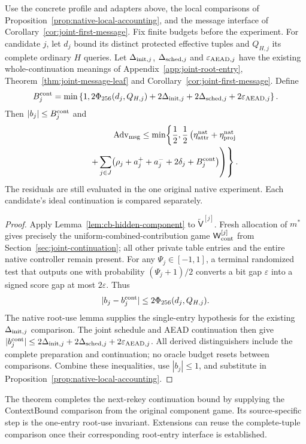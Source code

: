 \begin{theorem}
\label{thm:cb-next-rekey}
Use the concrete profile and adapters above, the local comparisons of
Proposition~\ref{prop:native-local-accounting}, and the message interface
of Corollary~\ref{cor:joint-first-message}. Fix finite budgets before the
experiment. For candidate $j$, let $d_j$ bound its distinct protected
effective tuples and $Q_{H,j}$ its complete ordinary $H$ queries. Let
$\Delta_{{\rm init},j}$, $\Delta_{{\rm sched},j}$ and
$\varepsilon_{{\rm AEAD},j}$ have the existing whole-continuation meanings
of Appendix~\ref{app:joint-root-entry},
Theorem~\ref{thm:joint-message-leaf} and
Corollary~\ref{cor:joint-first-message}. Define
\begin{equation}
 B_j^{\rm cont}=\min\left\{1,
 2\Phi_{256}(d_j,Q_{H,j})+2\Delta_{{\rm init},j}
 +2\Delta_{{\rm sched},j}+2\varepsilon_{{\rm AEAD},j}\right\}.
 \label{eq:cb-continuation-bound}
\end{equation}
Then $|b_j|\le B_j^{\rm cont}$ and
\begin{equation}
\begin{split}
 \operatorname{Adv}_{\rm msg}\le
 \min\!\left\{\frac12,\frac12\left(
 \eta_{\rm attr}^{\rm nat}+\eta_{\rm proj}^{\rm nat}\right.\right.\\[-2pt]
 \left.\left.\qquad+
 \sum_{j\in J}\bigl(\rho_j+a_j^++a_j^-+2\delta_j+B_j^{\rm cont}\bigr)
 \right)\right\}.
\end{split}
 \label{eq:cb-native-bound}
\end{equation}
The residuals are still evaluated in the one original native experiment.
Each candidate's ideal continuation is compared separately.
\end{theorem}
\begin{proof}
Apply Lemma~\ref{lem:cb-hidden-component} to
$\widetilde{\mathsf V}^{[j]}$. Fresh allocation of $m^*$ gives precisely
the uniform-combined-contribution game
$\mathsf W_{\rm cont}^{[j]}$ from
Section~\ref{sec:joint-continuation}; all other private table entries and
the entire native controller remain present. For any
$\Psi_j\in[-1,1]$, a terminal randomized test that outputs one with
probability $(\Psi_j+1)/2$ converts a bit gap $\varepsilon$ into a signed
score gap at most $2\varepsilon$. Thus
\[
 |b_j-b_j^{\rm cont}|\le2\Phi_{256}(d_j,Q_{H,j}).
\]
The native root-use lemma supplies the single-entry hypothesis for the
existing $\Delta_{{\rm init},j}$ comparison. The joint schedule and AEAD
continuation then give
$|b_j^{\rm cont}|\le2\Delta_{{\rm init},j}
 +2\Delta_{{\rm sched},j}+2\varepsilon_{{\rm AEAD},j}$.
All derived distinguishers include the complete preparation and continuation;
no oracle budget resets between comparisons. Combine these inequalities, use
$|b_j|\le1$, and substitute in
Proposition~\ref{prop:native-local-accounting}.
\end{proof}

The theorem completes the next-rekey continuation bound by supplying the
ContextBound comparison from the original component game. Its
source-specific step is the one-entry root-use invariant. Extensions can
reuse the complete-tuple comparison once their corresponding root-entry
interface is established.
